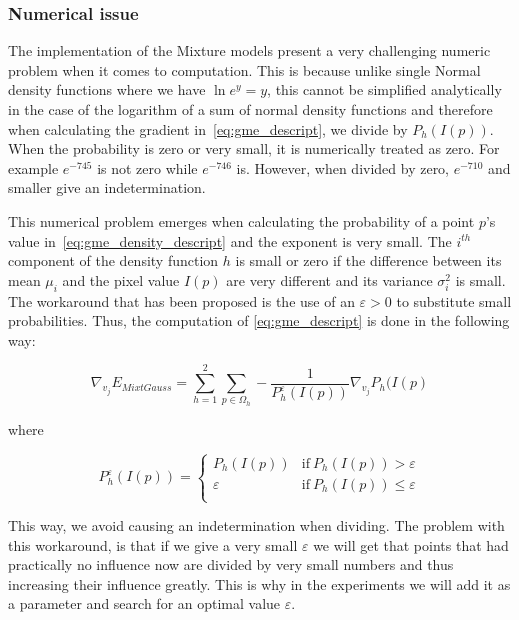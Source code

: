 \subsubsection{Numerical issue}
\label{subsubsec:numerical_issue}
The implementation of the Mixture models present a very challenging numeric problem when it comes to computation. This is because unlike single Normal density functions where  we have $\ln e^y=y$, this cannot be simplified analytically in the case of the logarithm of a sum of normal density functions and therefore when calculating the gradient in~\eqref{eq:gme_descript}, we divide by $P_h(I(p))$. When the probability is zero or very small, it is numerically treated as zero. For example $e^{-745}$ is not zero while $e^{-746}$ is. However, when divided by zero, $e^{-710}$ and smaller give an indetermination.

This numerical problem emerges when calculating the probability of a point $p$'s value in~\eqref{eq:gme_density_descript} and the exponent is very small. The $i^{th}$ component of the density function $h$ is small or zero if the difference between its mean $\mu_i$ and the pixel value $I(p)$ are very different and its variance $\sigma_i^2$ is small. The workaround that has been proposed is the use of an $\varepsilon>0$ to substitute small probabilities. Thus, the computation of \eqref{eq:gme_descript} is done in the following way:


\begin{equation}\label{eq:gme_descript_epsilon}
\nabla_{v_j}E_{MixtGauss} =
\sum\limits_{h =1}^{2} \sum\limits_{p \in \Omega_h} -\frac{1}{P_h^{\varepsilon}(I(p))}\nabla_{v_j} P_h(I(p) 
\end{equation}

where 

\begin{equation}
	P_h^{\varepsilon}(I(p))=
	\begin{cases}
	P_h(I(p)) & \mathrm{if\ } P_h(I(p))> \varepsilon\\
	\varepsilon & \mathrm{if\ } P_h(I(p))\leq \varepsilon\\
	\end{cases}
\end{equation}

This way, we avoid causing an indetermination when dividing. The problem with this workaround, is that if we give a very small $\varepsilon$ we will get that points that had practically no influence now are divided by very small numbers and thus increasing their influence greatly. This is why in the experiments we will add it as a parameter and search for an optimal value $\varepsilon$. 

